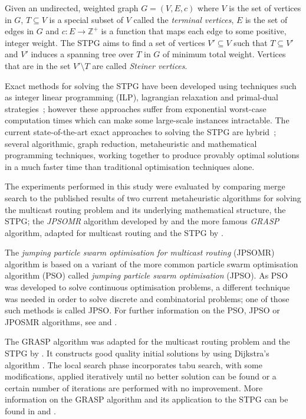 \documentclass[preprint]{elsarticle}
\begin{document}
Given an undirected, weighted graph $G = (V,E,c)$ where $V$ is the set of vertices in $G$, $T \subseteq V$ is a special subset of $V$ called the \emph{terminal vertices}, $E$ is the set of edges in $G$ and $c : E \to \mathbb{Z^+}$ is a function that maps each edge to some positive, integer weight. The STPG aims to find a set of vertices $V' \subseteq V$ such that $T \subseteq V'$ and $V'$ induces a spanning tree over $T$ in $G$ of minimum total weight. Vertices that are in the set $V' \setminus T$ are called \emph{Steiner vertices}.


Exact methods for solving the STPG have been developed using techniques such as integer linear programming (ILP), lagrangian relaxation and primal-dual strategies~\citep{pd:polzin}; however these approaches suffer from exponential worst-case computation times which can make some large-scale instances intractable. The current state-of-the-art exact approaches to solving the STPG are hybrid~\citep{algo:polzin,algo:daneshmand}; several algorithmic, graph reduction, metaheuristic and mathematical programming techniques, working together to produce provably optimal solutions in a much faster time than traditional optimisation techniques alone.


The experiments performed in this study were evaluated by comparing merge search to the published results of two current metaheuristic algorithms for solving the multicast routing problem and its underlying mathematical structure, the STPG; the \emph{JPSOMR} algorithm developed by \citet{jpsomr:qu} and the more famous \emph{GRASP} algorithm, adapted for multicast routing and the STPG by \citet{grasp:skorin}.

The \emph{jumping particle swarm optimisation for multicast routing} (JPSOMR) algorithm is based on a variant of the more common particle swarm optimisation algorithm (PSO) called \emph{jumping particle swarm optimisation} (JPSO). As PSO was developed to solve continuous optimisation problems, a different technique was needed in order to solve discrete and combinatorial problems; one of those such methods is called JPSO. For further information on the PSO, JPSO or JPOSMR algorithms, see \citet{pso:kennedy, jpso:consoli} and \citet{jpsomr:qu}.

The GRASP algorithm was adapted for the multicast routing problem and the STPG by \citet{grasp:skorin}. It constructs good quality initial solutions by using Dijkstra's algorithm \citep{dijk:dijkstra}. The local search phase incorporates tabu search, with some modifications, applied iteratively until no better solution can be found or a certain number of iterations are performed with no improvement. More information on the GRASP algorithm and its application to the STPG can be found in \citet{grasp:feo, grasp:skorin} and \citet{grasp:martins}.
\end{document}
